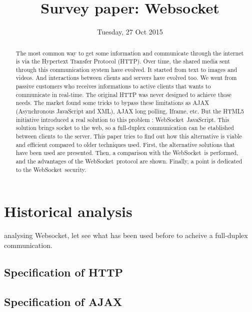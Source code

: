 \documentclass[journal,compsoc]{IEEEtran}
\newcommand{\ws}{WebSocket~}
\begin{document}
\author{}

\title{Survey paper: Websocket}

\date{Tuesday, 27 Oct 2015}

\maketitle
\IEEEpeerreviewmaketitle



\begin{abstract}
The most common way to get some information and communicate through the internet is via the Hypertext Transfer Protocol (HTTP).
Over time, the shared media sent through this communication system have evolved.
It started from text to images and videos.
And interactions between clients and servers have evolved too.
We went from passive customers who receives informations to active clients that wants to communicate in real-time.
The original HTTP was never designed to achieve those needs.
The market found some tricks to bypass these limitations as AJAX (Asynchronous JavaScript and XML), AJAX long polling, Iframe, etc.
But the HTML5 initiative introduced a real solution to this problem : \ws JavaScript.
This solution brings socket to the web, so a full-duplex communication can be etablished between clients to the server.
This paper tries to find out how this alternative is viable and efficient compared to older techniques used. \cite{http-rfc}
First, the alternative solutions that have been used are presented.
Then, a comparison with the \ws is performed, and the advantages of the \ws protocol are shown.
Finally, a point is dedicated to the \ws security.
\end{abstract}


\section{Historical analysis}



 analysing Websocket, let see what has been used before to acheive a full-duplex communication.

\subsection{Specification of HTTP}

\subsection{Specification of AJAX}
\end{document}
